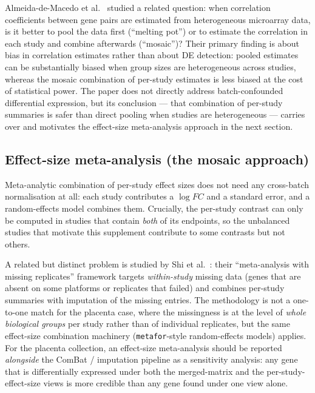 \documentclass[11pt,a4paper]{article}
\begin{document}
Almeida-de-Macedo et al.~\cite{macedo2013} studied a related
question: when correlation coefficients between gene pairs are
estimated from heterogeneous microarray data, is it better to pool
the data first (``melting pot'') or to estimate the correlation in
each study and combine afterwards (``mosaic'')? Their primary
finding is about bias in correlation estimates rather than about
DE detection: pooled estimates can be substantially biased when
group sizes are heterogeneous across studies, whereas the mosaic
combination of per-study estimates is less biased at the cost of
statistical power. The paper does not directly address
batch-confounded differential expression, but its conclusion ---
that combination of per-study summaries is safer than direct
pooling when studies are heterogeneous --- carries over and
motivates the effect-size meta-analysis approach in the next
section.

\subsection{Effect-size meta-analysis (the mosaic approach)}

Meta-analytic combination of per-study effect sizes does not need
any cross-batch normalisation at all: each study contributes a
$\log\!\mathit{FC}$ and a standard error, and a random-effects
model combines them. Crucially, the per-study contrast can only be
computed in studies that contain \emph{both} of its endpoints, so
the unbalanced studies that motivate this supplement contribute to
some contrasts but not others.

A related but distinct problem is studied by Shi et
al.~\cite{shi2011}: their ``meta-analysis with missing
replicates'' framework targets \emph{within-study} missing data
(genes that are absent on some platforms or replicates that
failed) and combines per-study summaries with imputation of the
missing entries. The methodology is not a one-to-one match for
the placenta case, where the missingness is at the level of
\emph{whole biological groups} per study rather than of individual
replicates, but the same effect-size combination machinery
(\texttt{metafor}-style random-effects models) applies. For the
placenta collection, an effect-size meta-analysis should be
reported \emph{alongside} the ComBat / imputation pipeline as a
sensitivity analysis: any gene that is differentially expressed
under both the merged-matrix and the per-study-effect-size views
is more credible than any gene found under one view alone.
\end{document}
